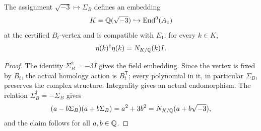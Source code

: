 \begin{proposition}\label{prop:Kcompatible}
The assignment $\sqrt{-3}\mapsto \Sigma_B$ defines an embedding
\[
 K=\mathbb Q(\sqrt{-3})\hookrightarrow\operatorname{End}^0(A_z)
\]
at the certified $B_t$-vertex and is compatible with $E_1$: for every $k\in K$,
\[
 \eta(k)^\dagger\eta(k)=N_{K/\mathbb Q}(k)I.
\]
\end{proposition}
\begin{proof}
The identity $\Sigma_B^2=-3I$ gives the field embedding. Since the vertex is fixed by $B_t$, the actual homology action is $B_t^{\mathsf T}$; every polynomial in it, in particular $\Sigma_B$, preserves the complex structure. Integrality gives an actual endomorphism. The relation $\Sigma_B^\dagger=-\Sigma_B$ gives
\[
 (a-b\Sigma_B)(a+b\Sigma_B)=a^2+3b^2=N_{K/\mathbb Q}(a+b\sqrt{-3}),
\]
and the claim follows for all $a,b\in\mathbb Q$.
\end{proof}


